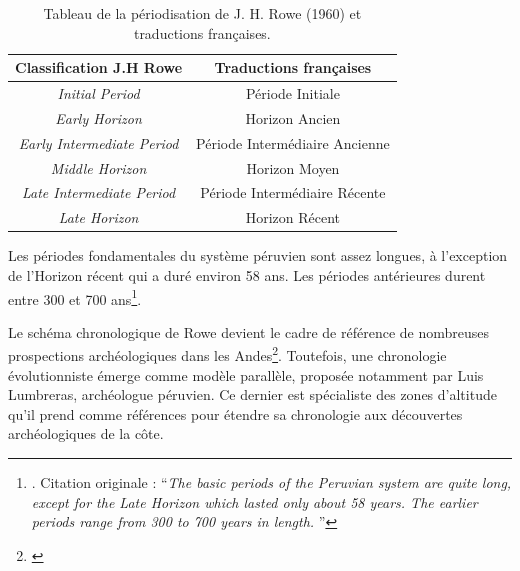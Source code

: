 \begin{table}
    \centering
    \begin{tabular}{|c|c|}
        \hline
        \textbf{Classification J.H Rowe} & \textbf{Traductions françaises} \\[1ex] \hline
         \textit{Initial Period} & Période Initiale \\[1ex] \hline
          \textit{Early Horizon} & Horizon Ancien \\ [1ex]\hline
          \textit{Early Intermediate Period} & Période Intermédiaire Ancienne \\ [1ex]\hline
          \textit{Middle Horizon} &  Horizon Moyen \\[1ex] \hline
          \textit{Late Intermediate Period} &  Période Intermédiaire Récente\\[1ex] \hline
          \textit{Late Horizon} &  Horizon Récent \\[1ex] \hline
    \end{tabular}
    \caption{Tableau de la périodisation de J. H. Rowe (1960) et traductions françaises.}
    \label{tab:periodsTrad}
\end{table} 
 
\begin{citer}
	Les périodes fondamentales du système péruvien sont assez longues, à l'exception de l'Horizon récent qui a duré environ 58 ans. Les périodes antérieures durent entre 300 et 700 ans\footnote{\cite[p.~50]{roweStagesPeriodsArchaeological1962}. Citation originale : \textquotedblleft \textit{The basic periods of the Peruvian system are quite long, except for the Late Horizon which lasted only 	about 58 years. The earlier periods range from 300 to 700 years in length. }\textquotedblright}.
\end{citer}

\noindent Le schéma chronologique de Rowe devient le cadre de référence de nombreuses prospections archéologiques dans les Andes\footnote{\cite[p.~19]{ramonjoffrePeriodificacionArqueologiaPeruana2005}}. Toutefois, une chronologie évolutionniste émerge comme modèle parallèle, proposée notamment par Luis Lumbreras, archéologue péruvien. Ce dernier est spécialiste des zones d'altitude qu'il prend comme références pour étendre sa chronologie aux découvertes archéologiques de la côte.

